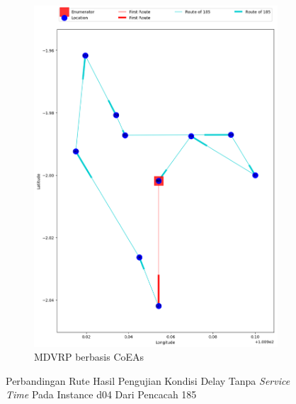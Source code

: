 \begin{figure}[H]
	\centering
	\begin{subfigure}[t]{\textwidth}
		\centering
		\includegraphics[width=\textwidth]{Resources/Images/delayed_4/real_m15_n100_delayed_4_185_coes}
		\caption{MDVRP berbasis CoEAs}
		\label{fig:real_m15_n100_delayed_4_185_coes}
	\end{subfigure}
	\caption{Perbandingan Rute Hasil Pengujian Kondisi Delay Tanpa \textit{Service Time} Pada Instance d04 Dari Pencacah 185}
	\label{fig:real_m15_n100_delayed_4_185}
\end{figure}


